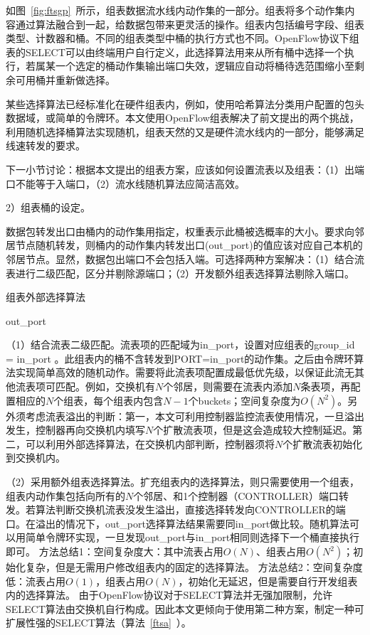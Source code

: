 如图~\ref{fig:ftsgp}~所示，组表数据流水线内动作集的一部分。组表将多个动作集内容通过算法融合到一起，给数据包带来更灵活的操作。组表内包括编号字段、组表类型、计数器和桶。不同的组表类型中桶的执行方式也不同。OpenFlow协议下组表的SELECT可以由终端用户自行定义，此选择算法用来从所有桶中选择一个执行，若属某一个选定的桶动作集输出端口失效，逻辑应自动将桶待选范围缩小至剩余可用桶并重新做选择。

某些选择算法已经标准化在硬件组表内，例如，使用哈希算法分类用户配置的包头数据域，或简单的令牌环。本文使用OpenFlow组表解决了前文提出的两个挑战，利用随机选择桶算法实现随机，组表天然的又是硬件流水线内的一部分，能够满足线速转发的要求。

下一小节讨论：根据本文提出的组表方案，应该如何设置流表以及组表：（1）出端口不能等于入端口，（2）流水线随机算法应简洁高效。


2）组表桶的设定。

数据包转发出口由桶内的动作集用指定，权重表示此桶被选概率的大小。要求向邻居节点随机转发，则桶内的动作集内转发出口(out\_port)的值应该对应自己本机的邻居节点。显然，数据包出端口不会包括入端。可选择两种方案解决：（1）结合流表进行二级匹配，区分并剔除源端口；（2）开发额外组表选择算法剔除入端口。

\begin{algorithm}[!h]
	\caption{组表外部选择算法 \label{ftsa}}
	\IncMargin{2em}
	\DontPrintSemicolon
	
	
	\Return out\_port
	
\end{algorithm}

（1）结合流表二级匹配。流表项的匹配域为in\_port，设置对应组表的group\_id = in\_port 。此组表内的桶不含转发到PORT=in\_port的动作集。之后由令牌环算法实现简单高效的随机动作。需要将此流表项配置成最低优先级，以保证此流无其他流表项可匹配。例如，交换机有$ N $个邻居，则需要在流表内添加$ N $条表项，再配置相应的$ N $个组表，每个组表内包含$N-1$个buckets；空间复杂度为$O(N^2)$。另外须考虑流表溢出的判断：第一，本文可利用控制器监控流表使用情况，一旦溢出发生，控制器再向交换机内填写$ N $个扩散流表项，但是这会造成较大控制延迟。第二，可以利用外部选择算法，在交换机内部判断，控制器须将$ N $个扩散流表初始化到交换机内。

（2）采用额外组表选择算法。扩充组表内的选择算法，则只需要使用一个组表，组表内动作集包括向所有的$N$个邻居、和1个控制器（CONTROLLER）端口转发。若算法判断交换机流表没发生溢出，直接选择转发向CONTROLLER的端口。在溢出的情况下，out\_port选择算法结果需要同in\_port做比较。随机算法可以用简单令牌环实现，一旦发现out\_port与in\_port相同则选择下一个桶直接执行即可。
方法总结1：空间复杂度大：其中流表占用$O(N)$、组表占用$O(N^2)$；初始化复杂，但是无需用户修改组表内的固定的选择算法。
方法总结2：空间复杂度低：流表占用$O(1)$，组表占用$O(N)$，初始化无延迟，但是需要自行开发组表内的选择算法。
由于OpenFlow协议对于SELECT算法并无强加限制，允许SELECT算法由交换机自行构成。因此本文更倾向于使用第二种方案，制定一种可扩展性强的SELECT算法（算法~\ref{ftsa}~）。



